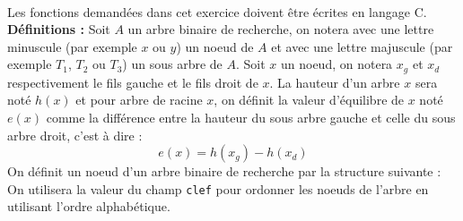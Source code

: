 \documentclass[11pt,a4paper]{article}
\begin{document}
\begin{Exercise}[title = {Implémentation d'un tableau associatif}, origin = {\bac \; {\sc ccmp 2025}, {\sc mpi} } ]\\
	Les fonctions demandées dans cet exercice doivent être écrites en langage C. \\
	{\bf Définitions :} Soit $A$ un arbre binaire de recherche, on notera avec une lettre minuscule (par exemple $x$ ou $y$) un noeud de $A$ et avec une lettre majuscule (par exemple $T_1$, $T_2$ ou $T_3$) un sous arbre de $A$. Soit $x$ un noeud, on notera $x_g$ et $x_d$ respectivement le fils gauche et le fils droit de $x$. La hauteur d'un arbre $x$ sera noté $h(x)$ et pour arbre de racine $x$, on définit la valeur d'équilibre de $x$ noté $e(x)$ comme la différence entre la hauteur du sous arbre gauche et celle du sous arbre droit, c'est à dire :
	$$ e(x) = h(x_g) - h(x_d)$$
	On définit un noeud d'un arbre binaire de recherche par la structure suivante :
	On utilisera la valeur du champ {\tt clef} pour ordonner les noeuds de l'arbre en utilisant l'ordre alphabétique.


\end{Exercise}
\end{document}

